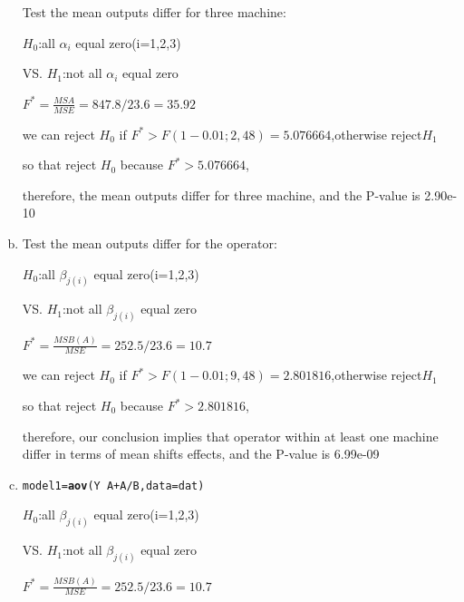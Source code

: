 \documentclass{article}\usepackage[]{graphicx}\usepackage[]{color}
\makeatletter
\newcommand{\hlopt}[1]{\textcolor[rgb]{0,0,0}{#1}}%
\newcommand{\hlstd}[1]{\textcolor[rgb]{0.345,0.345,0.345}{#1}}%
\newcommand{\hlkwb}[1]{\textcolor[rgb]{0.69,0.353,0.396}{#1}}%
\newcommand{\hlkwc}[1]{\textcolor[rgb]{0.333,0.667,0.333}{#1}}%
\newcommand{\hlkwd}[1]{\textcolor[rgb]{0.737,0.353,0.396}{\textbf{#1}}}%
\newenvironment{kframe}{%
 \def\at@end@of@kframe{}%
 \ifinner\ifhmode%
  \def\at@end@of@kframe{\end{minipage}}%
  \begin{minipage}{\columnwidth}%
 \fi\fi%
 \def\FrameCommand##1{\hskip\@totalleftmargin \hskip-\fboxsep
 \colorbox{shadecolor}{##1}\hskip-\fboxsep
     \hskip-\linewidth \hskip-\@totalleftmargin \hskip\columnwidth}%
 \MakeFramed {\advance\hsize-\width
   \@totalleftmargin\z@ \linewidth\hsize
   \@setminipage}}%
 {\par\unskip\endMakeFramed%
 \at@end@of@kframe}
\newenvironment{knitrout}{}{} %
\makeatother
\begin{document}
\begin{enumerate}[(a)]
Test the mean outputs differ for three machine:

\begin{center}
$H_0$:all $\alpha_i$ equal zero(i=1,2,3)

VS. $H_1$:not all $\alpha_i$ equal zero

$F^*=\frac{MSA}{MSE} = 847.8/23.6  = 35.92$

we can reject $H_0$ if $F^* > F(1-0.01;2,48)=5.076664$,otherwise reject$H_1$

so that reject $H_0$ because $F^*>5.076664$,

therefore, the mean outputs differ for three machine, and the P-value is 2.90e-10
\end{center}

\item

Test the mean outputs differ for the operator:

\begin{center}
$H_0$:all $\beta_{j(i)}$ equal zero(i=1,2,3)

VS. $H_1$:not all $\beta_{j(i)}$ equal zero

$F^*=\frac{MSB(A)}{MSE} = 252.5/23.6  = 10.7$

we can reject $H_0$ if $F^* > F(1-0.01;9,48)=2.801816$,otherwise reject$H_1$

so that reject $H_0$ because $F^*>2.801816$,

therefore, our conclusion implies that operator within at least one machine differ in terms of mean shifts effects, and the P-value is 6.99e-09
\end{center}

\item

\begin{knitrout}
\color{fgcolor}\begin{kframe}
\begin{alltt}
  \hlstd{model1} \hlkwb{=} \hlkwd{aov}\hlstd{(Y} \hlopt{~} \hlstd{A} \hlopt{+} \hlstd{A}\hlopt{/}\hlstd{B,} \hlkwc{data} \hlstd{= dat)}
\end{alltt}
\end{kframe}
\end{knitrout}

\begin{center}
$H_0$:all $\beta_{j(i)}$ equal zero(i=1,2,3)

VS. $H_1$:not all $\beta_{j(i)}$ equal zero

$F^*=\frac{MSB(A)}{MSE} = 252.5/23.6  = 10.7$


\end{center}
\end{enumerate}
\end{document}
